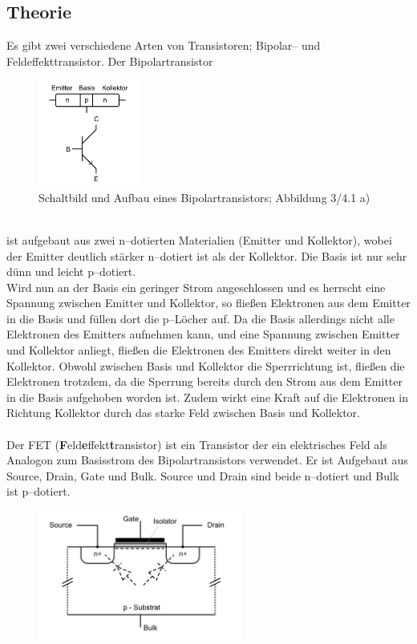 \documentclass[a4paper,10pt]{article}
\numberwithin{equation}{section}
\begin{document}
\clearpage
\begin{multicols}{2}
\section{Theorie}
Es gibt zwei verschiedene Arten von Transistoren; Bipolar-- und Feldeffekttransistor.
Der Bipolartransistor
\begin{figure}[h]
        \centering
        \includegraphics[width=0.3\textwidth]{bipolartransistor.png}
        \caption{Schaltbild und Aufbau eines Bipolartransistors; Abbildung 3/4.1 a) \cite{Praktikumsanleitung}}
\end{figure}\\
ist aufgebaut aus zwei n--dotierten Materialien (Emitter und Kollektor), wobei der Emitter deutlich stärker n--dotiert ist als der Kollektor.
Die Basis ist nur sehr dünn und leicht p--dotiert.
\\\indent Wird nun an der Basis ein geringer Strom angeschlossen und es herrscht eine Spannung zwischen Emitter und Kollektor, so fließen Elektronen aus dem Emitter in die Basis und füllen dort die p--Löcher auf.
Da die Basis allerdings nicht alle Elektronen des Emitters aufnehmen kann, und eine Spannung zwischen Emitter und Kollektor anliegt, fließen die Elektronen des Emitters direkt weiter in den Kollektor.
Obwohl zwischen Basis und Kollektor die Sperrrichtung ist, fließen die Elektronen trotzdem, da die Sperrung bereits durch den Strom aus dem Emitter in die Basis aufgehoben worden ist.
Zudem wirkt eine Kraft auf die Elektronen in Richtung Kollektor durch das starke Feld zwischen Basis und Kollektor.
\\\\ Der FET (\textbf{F}eld\textbf{e}ffekt\textbf{t}ransistor) ist ein Transistor der ein elektrisches Feld als Analogon zum Basisstrom des Bipolartransistors verwendet.
Er ist Aufgebaut aus Source, Drain, Gate und Bulk.
Source und Drain sind beide n--dotiert und Bulk ist p--dotiert.
\begin{figure}[h]
        \centering
        \includegraphics[width=0.6\textwidth]{fet.png}

\end{figure}
\end{multicols}
\end{document}
